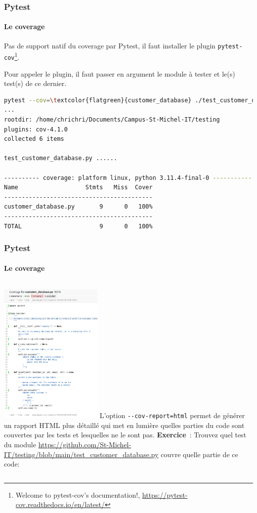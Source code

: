 \documentclass{beamer}
\begin{document}
    \begin{frame}[fragile]
        \frametitle{Pytest}
        \framesubtitle{Le coverage}
        \transdissolve
        Pas de support natif du coverage par Pytest, il faut installer le plugin \lstinline{pytest-cov}\footnote{Welcome to pytest-cov’s documentation!, \url{https://pytest-cov.readthedocs.io/en/latest/}}.

        Pour appeler le plugin, il faut passer en argument le module à tester et le(s) test(s) de ce dernier.


        \begin{lstlisting}[language=sh]
pytest --cov=\textcolor{flatgreen}{customer_database} ./test_customer_database.py
...
rootdir: /home/chrichri/Documents/Campus-St-Michel-IT/testing
plugins: cov-4.1.0
collected 6 items

test_customer_database.py ......                                                                                                                                                                                                 [100%]

---------- coverage: platform linux, python 3.11.4-final-0 -----------
Name                   Stmts   Miss  Cover
------------------------------------------
customer_database.py       9      0   100%
------------------------------------------
TOTAL                      9      0   100%
        \end{lstlisting}

    \end{frame}

    \begin{frame}
        \frametitle{Pytest}
        \framesubtitle{Le coverage}
        \transdissolve
        \begin{columns}

            \centering
            \includegraphics[width=5cm]{image/html-coverage}
            L'option \lstinline{--cov-report=html} permet de générer un rapport HTML plus détaillé qui met en lumière quelles parties du code sont couvertes par les tests et lesquelles ne le sont pas.
            \bigbreak
            \textbf{Exercice}~: Trouvez quel test du module \url{https://github.com/St-Michel-IT/testing/blob/main/test_customer_database.py} couvre quelle partie de ce code:
        \end{columns}

    \end{frame}
\end{document}
